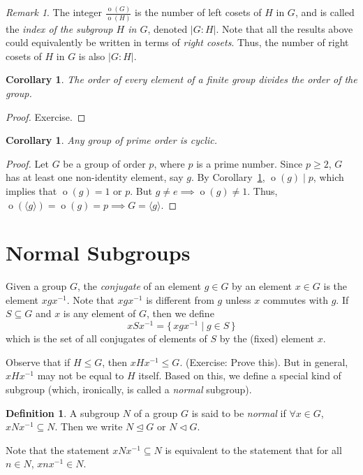\documentclass[svgnames]{article}
\newtheorem{Corollary}[Theorem]{Corollary}
\theoremstyle{definition}
\newtheorem{Definition}[Theorem]{Definition}
\theoremstyle{remark}
\newtheorem*{Remark*}{Remark}
\DeclareMathOperator{\ord}{o}
\begin{document}
\begin{Remark*}\label{def:SubgroupIndex}
The integer $\frac{\ord(G)}{\ord(H)}$ is the number of left cosets of $H$ in $G$, and is called the \emph{index of the subgroup $H$ in $G$}, denoted $|G : H|$. Note that all the results above could equivalently be written in terms of \emph{right cosets}. Thus, the number of right cosets of $H$ in $G$ is also $|G : H|$.
\end{Remark*}

\begin{Corollary}\label{cor:OrderElem}
The order of every element of a finite group divides the order of the group.
\end{Corollary}
\begin{proof}
Exercise.
\end{proof}

\begin{Corollary}\label{cor:Prime=>Cyc}
Any group of prime order is cyclic.
\end{Corollary}
\begin{proof}
Let $G$ be a group of order $p$, where $p$ is a prime number. Since $p \ge 2$, $G$ has at least one non-identity element, say $g$. By Corollary~\ref{cor:OrderElem}, $\ord(g) \mid p$, which implies that $\ord(g) = 1$ or $p$. But $g \ne e \implies \ord(g) \ne 1$. Thus, $\ord(\langle g \rangle) = \ord(g) = p \implies G = \langle g \rangle$.
\end{proof}

\section{Normal Subgroups}\label{sec:NormSubs}
Given a group $G$, the \emph{conjugate} of an element $g \in G$ by an element $x \in G$ is the element $xgx^{-1}$. Note that $xgx^{-1}$ is different from $g$ unless $x$ commutes with $g$. If $S \subseteq G$ and $x$ is any element of $G$, then we define
\begin{equation*}
xSx^{-1} = \{\, xgx^{-1} \mid g \in S \,\}
\end{equation*}
which is the set of all conjugates of elements of $S$ by the (fixed) element $x$.

Observe that if $H \le G$, then $xHx^{-1} \le G$. {\small (Exercise: Prove this)}. But in general, $xHx^{-1}$ may not be equal to $H$ itself. Based on this, we define a special kind of subgroup (which, ironically, is called a \emph{normal} subgroup).

\begin{Definition}\label{def:NormSubgroup}
A subgroup $N$ of a group $G$ is said to be \emph{normal} if $\forall x \in G$, $xNx^{-1} \subseteq N$. Then we write $N \unlhd G$ or $N \lhd G$.
\end{Definition}
Note that the statement $xNx^{-1} \subseteq N$ is equivalent to the statement that for all $n \in N$, $xnx^{-1} \in N$.
\end{document}
